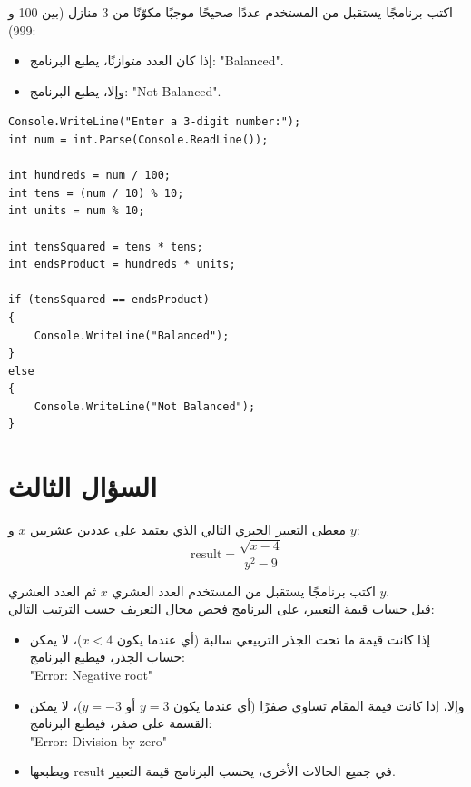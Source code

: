 \documentclass[14pt]{extarticle}
\begin{document}
اكتب برنامجًا يستقبل من المستخدم عددًا صحيحًا موجبًا مكوّنًا من 3 منازل (بين 100 و 999):
\begin{itemize}[nosep]
    \item إذا كان العدد متوازنًا، يطبع البرنامج: \textenglish{"Balanced"}.
    \item وإلا، يطبع البرنامج: \textenglish{"Not Balanced"}.
\end{itemize}

\ifwithsols
\begin{boxSolution}
\begin{english}
\begin{verbatim}
Console.WriteLine("Enter a 3-digit number:");
int num = int.Parse(Console.ReadLine());

int hundreds = num / 100;
int tens = (num / 10) % 10;
int units = num % 10;

int tensSquared = tens * tens;
int endsProduct = hundreds * units;

if (tensSquared == endsProduct)
{
    Console.WriteLine("Balanced");
}
else
{
    Console.WriteLine("Not Balanced");
}
\end{verbatim}
\end{english}
\end{boxSolution}
\fi
\filbreak

\section{السؤال الثالث}
معطى التعبير الجبري التالي الذي يعتمد على عددين عشريين $x$ و $y$:
$$ \text{result} = \frac{\sqrt{x - 4}}{y^2 - 9} $$

اكتب برنامجًا يستقبل من المستخدم العدد العشري $x$ ثم العدد العشري $y$. \\
قبل حساب قيمة التعبير، على البرنامج فحص مجال التعريف حسب الترتيب التالي:
\begin{itemize}[nosep]
    \item إذا كانت قيمة ما تحت الجذر التربيعي سالبة (أي عندما يكون $x < 4$)، لا يمكن حساب الجذر، فيطبع البرنامج: \\
    \textenglish{"Error: Negative root"}
    \item وإلا، إذا كانت قيمة المقام تساوي صفرًا (أي عندما يكون $y = 3$ أو $y = -3$)، لا يمكن القسمة على صفر، فيطبع البرنامج: \\
    \textenglish{"Error: Division by zero"}
    \item في جميع الحالات الأخرى، يحسب البرنامج قيمة التعبير $\text{result}$ ويطبعها.
\end{itemize}
\end{document}
